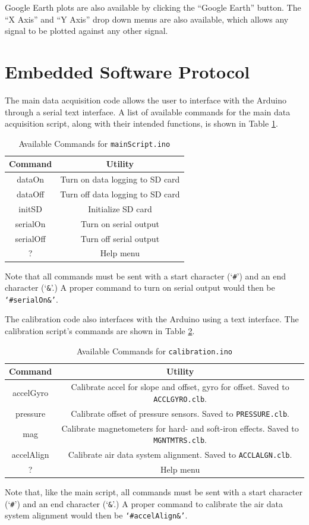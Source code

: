 Google Earth plots are also available by clicking the ``Google Earth'' button. The ``X Axis'' and ``Y Axis'' drop down menus are also available, which allows any signal to be plotted against any other signal.

\section{Embedded Software Protocol}
The main data acquisition code allows the user to interface with the Arduino through a serial text interface. A list of available commands for the main data acquisition script, along with their intended functions, is shown in Table \ref{table:mainScriptComms}.
\begin{table}[H]
\caption{Available Commands for \texttt{mainScript.ino}}
\centering
\begin{tabular}{|c | c|}
\hline
 Command & Utility\\
 \hline\hline
dataOn & Turn on data logging to SD card\\\hline
dataOff & Turn off data logging to SD card\\\hline
initSD & Initialize SD card\\\hline
serialOn & Turn on serial output\\\hline
serialOff & Turn off serial output\\\hline
? & Help menu\\\hline
\end{tabular}
\label{table:mainScriptComms}
\end{table}

Note that all commands must be sent with a start character (`\texttt{\#}') and an end character (`\texttt{\&}'.) A proper command to turn on serial output would then be \texttt{`\#serialOn\&'}.

The calibration code also interfaces with the Arduino using a text interface. The calibration script's commands are shown in Table \ref{table:calibComms}.
\begin{table}[H]
\caption{Available Commands for \texttt{calibration.ino}}
\centering
\begin{tabular}{|c | c|}
\hline
 Command & Utility\\
 \hline\hline
accelGyro & Calibrate accel for slope and offset, gyro for offset. 
Saved to \texttt{ACCLGYRO.clb}.\\\hline
pressure & Calibrate offset of pressure sensors. 
Saved to \texttt{PRESSURE.clb}.\\\hline
mag & Calibrate magnetometers for hard- and soft-iron effects. 
Saved to \texttt{MGNTMTRS.clb}.\\\hline
accelAlign & Calibrate air data system alignment.
 Saved to \texttt{ACCLALGN.clb}.\\\hline
? & Help menu\\\hline
\end{tabular}
\label{table:calibComms}
\end{table}

Note that, like the main script, all commands must be sent with a start character (`\texttt{\#}') and an end character (`\texttt{\&}'.) A proper command to calibrate the air data system alignment would then be \texttt{`\#accelAlign\&'}.